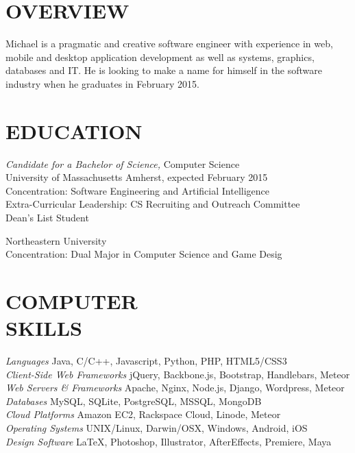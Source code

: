 \documentclass[line,margin]{res}
\begin{document}
\address{169 Brittany Mnr Apt F, Amherst, MA 01002}
\address{(781) 264-6283  --  mike@miketurley.com -- github.com/mturley}

\begin{resume}
 
\section{OVERVIEW}
    Michael is a pragmatic and creative software engineer with experience in web, mobile and desktop application development as well as systems, graphics, databases and IT.  He is looking to make a name for himself in the software industry when he graduates in February 2015.
 
 
\section{EDUCATION}
    {\sl Candidate for a Bachelor of Science,} Computer Science \\
    University of Massachusetts Amherst, 
    expected February 2015 \\
    Concentration: Software Engineering and Artificial Intelligence \\
    Extra-Curricular Leadership: CS Recruiting and Outreach Committee \\
    Dean's List Student

    Northeastern University \\
    Concentration: Dual Major in Computer Science and Game Desig
 
 
\section{COMPUTER \\ SKILLS}
    {\sl Languages} \hfill Java, C/C++, Javascript, Python, PHP, HTML5/CSS3 \\
    {\sl Client-Side Web Frameworks} \hfill jQuery, Backbone.js, Bootstrap, Handlebars, Meteor \\
    {\sl Web Servers \& Frameworks} \hfill Apache, Nginx, Node.js, Django, Wordpress, Meteor \\
    {\sl Databases} \hfill MySQL, SQLite, PostgreSQL, MSSQL, MongoDB \\
    {\sl Cloud Platforms} \hfill Amazon EC2, Rackspace Cloud, Linode, Meteor \\
    {\sl Operating Systems} \hfill UNIX/Linux, Darwin/OSX, Windows, Android, iOS \\
    {\sl Design Software} \hfill \LaTeX, Photoshop, Illustrator, AfterEffects, Premiere, Maya
 

\end{resume}
\end{document}
